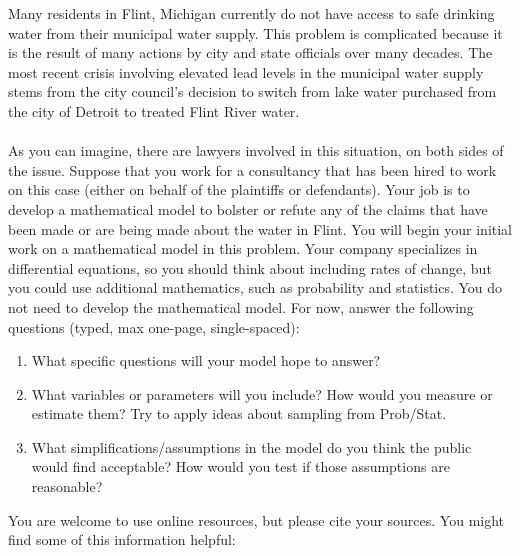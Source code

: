 \documentclass[12pt,letterpaper]{hmcpset}
\begin{document}
\begin{solution}
\vfill
\end{solution}
\newpage

\begin{problem}[4]
Many residents in Flint, Michigan currently do not have access to safe drinking water from their municipal water supply. This problem is complicated because it is the result of many actions by city and state officials over many decades. The most recent crisis involving elevated lead levels in the municipal water supply stems from the city council's decision to switch from lake water purchased from the city of Detroit to treated Flint River water.
\\\\
As you can imagine, there are lawyers involved in this situation, on both sides of the issue.  Suppose that you work for a consultancy that has been hired to work on this case (either on behalf of the plaintiffs or defendants). Your job is to develop a mathematical model to bolster or refute any of the claims that have been made or are being made about the water in Flint.  You will begin your initial work on a mathematical model in this problem. Your company specializes in differential equations, so you should think about including rates of change, but you could use additional mathematics, such as probability and statistics.  You do not need to develop the mathematical model.  For now, answer the following questions (typed, max one-page, single-spaced):

\begin{enumerate}
\item What specific questions will your model hope to answer?
\item What variables or parameters will you include?  How would you measure or estimate them?  Try to apply ideas about sampling from Prob/Stat.
\item What simplifications/assumptions in the model do you think the public would find acceptable?  How would you test if those assumptions are reasonable?
\end{enumerate}

You are welcome to use online resources, but please cite your sources. You might find some of this information helpful:


\end{problem}
\end{document}
